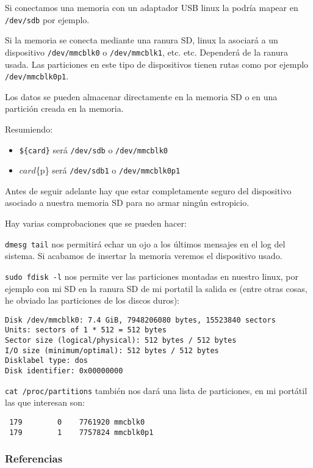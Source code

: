 \documentclass[12pt,spanish,]{article}
\providecommand{\tightlist}{%
  \setlength{\itemsep}{0pt}\setlength{\parskip}{0pt}}
\begin{document}
Si conectamos una memoria con un adaptador USB linux la podría mapear en
\texttt{/dev/sdb} por ejemplo.

Si la memoria se conecta mediante una ranura SD, linux la asociará a un
dispositivo \texttt{/dev/mmcblk0} o \texttt{/dev/mmcblk1}, etc. etc.
Dependerá de la ranura usada. Las particiones en este tipo de
dispositivos tienen rutas como por ejemplo \texttt{/dev/mmcblk0p1}.

Los datos se pueden almacenar directamente en la memoria SD o en una
partición creada en la memoria.

Resumiendo:

\begin{itemize}
\tightlist
\item
  \texttt{\$\{card\}} será \texttt{/dev/sdb} o \texttt{/dev/mmcblk0}
\item
  \({card}\)\{p\} será \texttt{/dev/sdb1} o \texttt{/dev/mmcblk0p1}
\end{itemize}

Antes de seguir adelante hay que estar completamente seguro del
dispositivo asociado a nuestra memoria SD para no armar ningún
estropicio.

Hay varias comprobaciones que se pueden hacer:

\texttt{dmesg\ \textbar{}tail} nos permitirá echar un ojo a los últimos
mensajes en el log del sistema. Si acabamos de insertar la memoria
veremos el dispositivo usado.

\texttt{sudo\ fdisk\ -l} nos permite ver las particiones montadas en
nuestro linux, por ejemplo con mi SD en la ranura SD de mi portatil la
salida es (entre otras cosas, he obviado las particiones de los discos
duros):

\begin{verbatim}
Disk /dev/mmcblk0: 7.4 GiB, 7948206080 bytes, 15523840 sectors
Units: sectors of 1 * 512 = 512 bytes
Sector size (logical/physical): 512 bytes / 512 bytes
I/O size (minimum/optimal): 512 bytes / 512 bytes
Disklabel type: dos
Disk identifier: 0x00000000
\end{verbatim}

\texttt{cat\ /proc/partitions} también nos dará una lista de
particiones, en mi portátil las que interesan son:

\begin{verbatim}
 179        0    7761920 mmcblk0
 179        1    7757824 mmcblk0p1
\end{verbatim}

\subsubsection{Referencias}\label{referencias}
\end{document}
